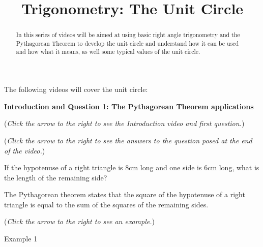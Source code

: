 \documentclass{ximera}
\title[Prerequisite Videos: ]{Trigonometry: The Unit Circle}
\begin{document}
\begin{abstract}
  In this series of videos will be aimed at using basic right angle
  trigonometry and the Pythagorean Theorem to develop the unit circle 
  and understand how it can be used and how what it means, 
  as well some typical values of the unit circle.
\end{abstract}
\maketitle

The following videos will cover the unit circle:

\textbf{Introduction and Question 1: The Pythagorean Theorem applications}
\begin{question}
\begin{flushright}
{\color{blue}(\emph{Click the arrow to the right to see the Introduction video and first question.})}
\end{flushright}
\begin{center}
\begin{expandable}
{\color{blue}(\emph{Click the arrow to the right to see the answers 
to the question posed at the end of the video.})}
\begin{expandable}
If the hypotenuse of a right triangle is $8$cm long and one side is
$6$cm long, what is the length of the remaining side?
\begin{multipleChoice}
\end{multipleChoice}
\begin{hint}
The Pythagorean theorem states that the square of the hypotenuse
of a right triangle is equal to the sum of the squares of the remaining
sides.
\end{hint}
\begin{flushright}
{\color{blue}(\emph{Click the arrow to the right to see an example.})}
\end{flushright}
\begin{expandable}
Example 1
\end{expandable}
\end{expandable}
\end{expandable}
\end{center}
\end{question}
\end{document}
